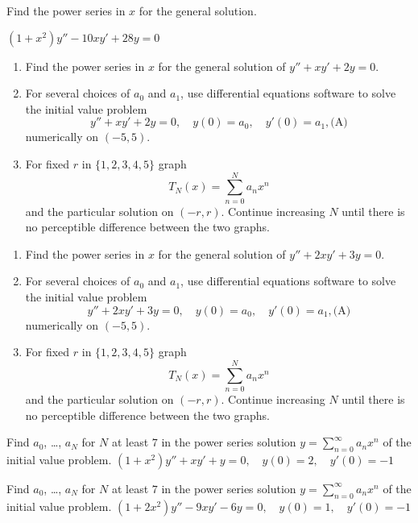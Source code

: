 \documentclass{ximera}
\begin{document}
\begin{problem}\label{exer:7.2.8} 
Find the power series in $x$ for the general solution.

$(1+x^2)y''-10xy'+28y=0$
\end{problem}


\begin{problem}\label{exer:7.2.9}   
\begin{enumerate}
\item %
Find the power series in $x$ for the general solution of
$y''+xy'+2y=0$.
\item %
For several choices of $a_0$ and $a_1$,
use  differential equations software to solve the initial
value problem
$$
y''+xy'+2y=0,\quad y(0)=a_0,\quad y'(0)=a_1,
\text{(A)}
$$
numerically on $(-5,5)$.
\item %
For fixed $r$ in $\{1,2,3,4,5\}$ graph
$$
T_N(x)=\sum_{n=0}^N a_nx^n
$$
and the particular solution on $(-r,r)$.
Continue increasing $N$ until there is no perceptible
difference between the two graphs.
\end{enumerate}
\end{problem}

\begin{problem}\label{exer:7.2.10}
\begin{enumerate}
\item %
Find the power series in $x$ for the general solution of
$y''+2xy'+3y=0$.
\item %
For several choices of $a_0$ and $a_1$,
use  differential equations software to solve the initial
value problem
$$
y''+2xy'+3y=0,\quad y(0)=a_0,\quad y'(0)=a_1,
\text{(A)}
$$
numerically on $(-5,5)$.
\item %
For fixed $r$ in $\{1,2,3,4,5\}$ graph
$$
T_N(x)=\sum_{n=0}^N a_nx^n
$$
and the particular solution on $(-r,r)$.
Continue increasing $N$ until there is no perceptible
difference between the two graphs.
\end{enumerate}
\end{problem}

\begin{problem}\label{exer:7.2.11} Find $a_0$, \dots, $a_N$ for $N$ at least $7$ in the power series solution $y=\sum_{n=0}^\infty a_nx^n$
of the initial value problem. $(1+x^2)y''+xy'+y=0,\quad y(0)=2,\quad
y'(0)=-1$
\end{problem}

\begin{problem}\label{exer:7.2.12} Find $a_0$, \dots, $a_N$ for $N$ at least $7$ in the power series solution $y=\sum_{n=0}^\infty a_nx^n$
of the initial value problem.  $(1+2x^2)y''-9xy'-6y=0,\quad y(0)=1,\quad
y'(0)=-1$
\end{problem}
\end{document}
